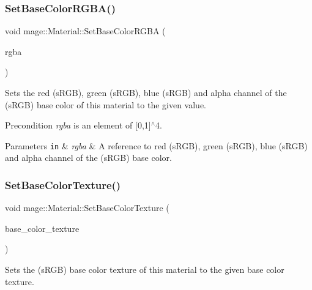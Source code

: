 \subsubsection{\texorpdfstring{Set\+Base\+Color\+R\+G\+B\+A()}{SetBaseColorRGBA()}\hspace{0.1cm}{\footnotesize\ttfamily [3/3]}}
{\footnotesize\ttfamily void mage\+::\+Material\+::\+Set\+Base\+Color\+R\+G\+BA (\begin{DoxyParamCaption}\item[{\hyperlink{structmage_1_1_r_g_b_a_spectrum}{R\+G\+B\+A\+Spectrum} \&\&}]{rgba }\end{DoxyParamCaption})\hspace{0.3cm}{\ttfamily [noexcept]}}

Sets the red (s\+R\+GB), green (s\+R\+GB), blue (s\+R\+GB) and alpha channel of the (s\+R\+GB) base color of this material to the given value.

\begin{DoxyPrecond}{Precondition}
{\itshape rgba} is an element of \mbox{[}0,1\mbox{]}$^\wedge$4. 
\end{DoxyPrecond}

\begin{DoxyParams}[1]{Parameters}
\mbox{\tt in}  & {\em rgba} & A reference to red (s\+R\+GB), green (s\+R\+GB), blue (s\+R\+GB) and alpha channel of the (s\+R\+GB) base color. \\
\hline
\end{DoxyParams}
\hypertarget{structmage_1_1_material_add87c1ebf7783980ac21e986c080505b}{}\label{structmage_1_1_material_add87c1ebf7783980ac21e986c080505b} 
\subsubsection{\texorpdfstring{Set\+Base\+Color\+Texture()}{SetBaseColorTexture()}}
{\footnotesize\ttfamily void mage\+::\+Material\+::\+Set\+Base\+Color\+Texture (\begin{DoxyParamCaption}\item[{const \hyperlink{namespacemage_a1e01ae66713838a7a67d30e44c67703e}{Shared\+Ptr}$<$ const \hyperlink{classmage_1_1_texture}{Texture} $>$ \&}]{base\+\_\+color\+\_\+texture }\end{DoxyParamCaption})}

Sets the (s\+R\+GB) base color texture of this material to the given base color texture.


